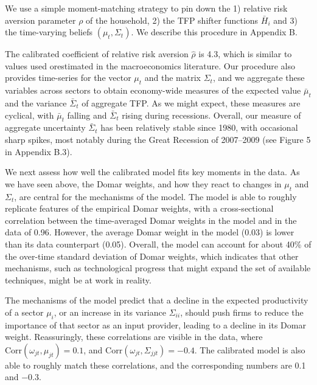 \documentclass[11pt]{article}
\theoremstyle{definition}
\begin{document}
	We use a simple moment-matching strategy to pin down the 1) relative risk aversion parameter $\rho$ of the household, 2) the TFP shifter functions $\bar{H}_i$ and 3) the time-varying beliefs $(\mu_t, \Sigma_t)$. We describe this procedure in Appendix B.
		
	The calibrated coefficient of relative risk aversion $\hat{\rho}$ is 4.3, which is similar to values used orestimated in the macroeconomics literature. Our procedure also provides time-series for the vector $\mu_t$ and the matrix $\Sigma_t$, and we aggregate these variables across sectors to obtain economy-wide measures of the expected value $\bar{\mu}_t$ and the variance $\bar{\Sigma}_t$ of aggregate TFP. As we might expect, these measures are cyclical, with $\bar{\mu}_t$ falling and $\bar{\Sigma}_t$ rising during recessions. Overall, our measure of aggregate uncertainty $\bar{\Sigma}_t$ has been relatively stable since 1980, with occasional sharp spikes, most notably during the Great Recession of 2007–2009 (see Figure 5 in Appendix B.3).
	
	We next assess how well the calibrated model fits key moments in the data. As we have seen above, the Domar weights, and how they react to changes in $\mu_t$ and $\Sigma_t$, are central for the mechanisms of the model. The model is able to roughly replicate features of the empirical Domar weights, with a cross-sectional correlation between the time-averaged Domar weights in the model and in the data of 0.96. However, the average Domar weight in the model (0.03) is lower than its data counterpart (0.05). Overall, the model can account for about 40\% of the over-time standard deviation of Domar weights, which indicates that other mechanisms, such as technological progress that might expand the set of available techniques, might be at work in reality.
	
	The mechanisms of the model predict that a decline in the expected productivity of a sector $\mu_i$, or an increase in its variance $\Sigma_{ii}$, should push firms to reduce the importance of that sector as an input provider, leading to a decline in its Domar weight. Reassuringly, these correlations are visible in the data, where $\text{Corr}(\omega_{jt},\mu_{jt}) = 0.1$, and $\text{Corr}(\omega_{jt}, \Sigma_{jjt}) = -0.4$. The calibrated model is also able to roughly match these correlations, and the corresponding numbers are 0.1 and −0.3.
	
\end{document}
